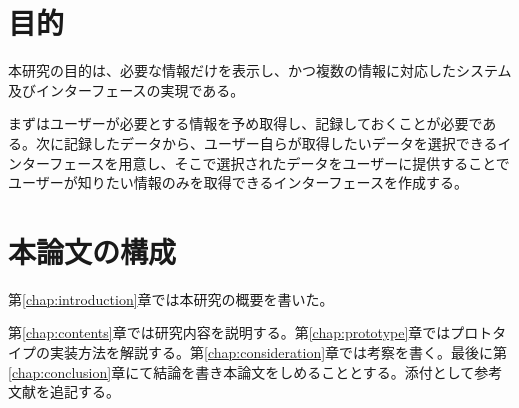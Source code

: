 \section{目的}
本研究の目的は、必要な情報だけを表示し、かつ複数の情報に対応したシステム及びインターフェースの実現である。

まずはユーザーが必要とする情報を予め取得し、記録しておくことが必要である。次に記録したデータから、ユーザー自らが取得したいデータを選択できるインターフェースを用意し、そこで選択されたデータをユーザーに提供することでユーザーが知りたい情報のみを取得できるインターフェースを作成する。

\section{本論文の構成}
第\ref{chap:introduction}章では本研究の概要を書いた。

第\ref{chap:contents}章では研究内容を説明する。第\ref{chap:prototype}章ではプロトタイプの実装方法を解説する。第\ref{chap:consideration}章では考察を書く。最後に第\ref{chap:conclusion}章にて結論を書き本論文をしめることとする。添付として参考文献を追記する。
